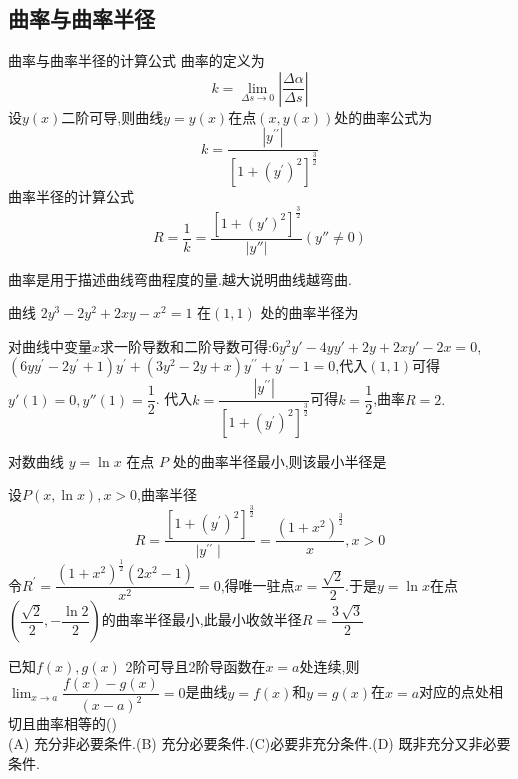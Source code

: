 \documentclass[8pt a4paper, oneside, UTF8]{ctexbook}  %
\begin{document}
\begin{sloppypar}
    \subsection{曲率与曲率半径}
    \begin{defn}{曲率与曲率半径的计算公式}{}
        曲率的定义为
        $$
            k=\lim_{\Delta s\to0}\left|\frac{\Delta\alpha}{\Delta s}\right|
        $$
        设$y(x)$二阶可导,则曲线$y=y(x)$在点$(x,y(x))$处的曲率公式为
        $$
            k=\dfrac{\left|y^{\prime\prime}\right|}{\left[1+(y^{\prime})^2\right]^{\frac{3}{2}}}
        $$
        \tcblower
        曲率半径的计算公式
        $$
            R=\dfrac{1}{k}=\dfrac{\left[1+(y')^2\right]^{\frac{3}{2}}}{\left|y''\right|}(y''\neq0)
        $$
    \end{defn}
    曲率是用于描述曲线弯曲程度的量.越大说明曲线越弯曲.
    \begin{problem}
    曲线 $2y^3-2y^2+2xy-x^2=1$ 在$(1,1)$ 处的曲率半径为
    \end{problem}
    \begin{solution}
        对曲线中变量$x$求一阶导数和二阶导数可得:$6y^2y'-4yy'+2y+2xy'-2x=0$,$(6yy^{\prime}-2y^{\prime}+1)y^{\prime}+(3y^{2}-2y+x)y^{\prime\prime}+y^{\prime}-1=0$,代入$(1,1)$可得$y'(1)=0,y''(1)=\dfrac{1}{2}$.
        代入$k=\dfrac{\left|y^{\prime\prime}\right|}{\left[1+(y^{\prime})^2\right]^{\frac{3}{2}}}$可得$k=\dfrac{1}{2}$,曲率$R=2.$
    \end{solution}
    \begin{problem}
    对数曲线 $y=\ln x$ 在点 $P$ 处的曲率半径最小,则该最小半径是
    \end{problem}
    \begin{solution}
        设$P(x,\operatorname{ln}x),x>0$,曲率半径
        $$
            R=\dfrac{\left[1+(y^{\prime})^{2}\right]^{\frac{3}{2}}}{\mid y^{\prime\prime}\mid}=\dfrac{(1+x^{2})^{\frac{3}{2}}}{x},x>0
        $$
        令$R^{\prime}={\dfrac{(1+x^{2})^{\frac{1}{2}}(2x^{2}-1)}{x^{2}}}=0$,得唯一驻点$x={\dfrac{\sqrt{2}}{2}}$.于是$y=\operatorname{ln}x$在点$\left({\dfrac{\sqrt{2}}{2}},-{\dfrac{\operatorname{ln}2}{2}}\right)$的曲率半径最小,此最小收敛半径$R={\dfrac{3\,{\sqrt{3}}}{2}}$
    \end{solution}
    \begin{problem}
    已知$f(x),g(x)$ 2阶可导且2阶导函数在$x=a$处连续,则$\lim_{x\to a} \dfrac{f(x)-g(x)}{\left(x-a\right)^2}=0$是曲线$y=f(x)$和$y=g(x)$在$x=a$对应的点处相切且曲率相等的()\\
    (A) 充分非必要条件.\quad (B) 充分必要条件.\quad (C)必要非充分条件.\quad (D) 既非充分又非必要条件.

\end{problem}
\end{sloppypar}
\end{document}
